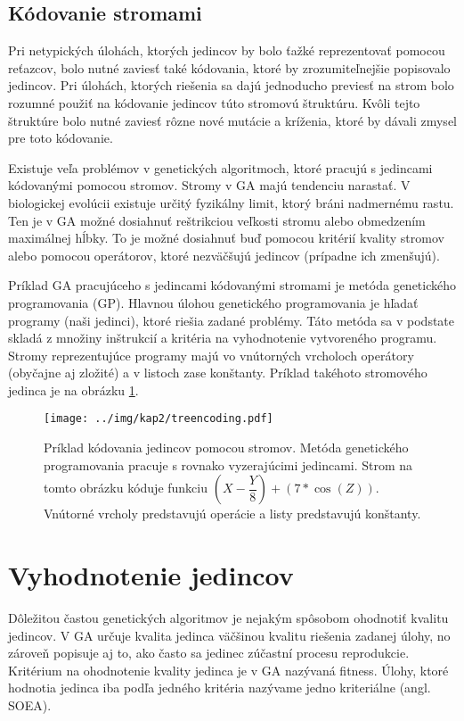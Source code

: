 \subsection{Kódovanie stromami}\label{kap2:2.2:2.2.3:Tree}
Pri netypických úlohách, ktorých jedincov by bolo ťažké reprezentovať pomocou reťazcov, bolo nutné zaviesť také kódovania, ktoré by zrozumiteľnejšie popisovalo jedincov. Pri úlohách, ktorých riešenia sa dajú jednoducho previesť na strom bolo rozumné použiť na kódovanie jedincov túto stromovú štruktúru. Kvôli tejto štruktúre bolo nutné zaviesť rôzne nové mutácie a kríženia, ktoré by dávali zmysel pre toto kódovanie. 

Existuje veľa problémov v genetických algoritmoch, ktoré pracujú s jedincami kódovanými pomocou stromov. Stromy v GA majú tendenciu narastať. V biologickej evolúcii existuje určitý fyzikálny limit, ktorý bráni nadmernému rastu. Ten je v GA možné dosiahnuť reštrikciou veľkosti stromu alebo obmedzením maximálnej hĺbky. To je možné dosiahnuť buď pomocou kritérií kvality stromov alebo pomocou operátorov, ktoré nezväčšujú jedincov (prípadne ich zmenšujú).

Príklad GA pracujúceho s jedincami kódovanými stromami je metóda genetického programovania (GP). Hlavnou úlohou genetického programovania je hľadať programy (naši jedinci), ktoré riešia zadané problémy. Táto metóda sa v podstate skladá z množiny inštrukcií a kritéria na vyhodnotenie vytvoreného programu. Stromy reprezentujúce programy majú vo vnútorných vrcholoch operátory (obyčajne aj zložité) a v listoch zase konštanty. Príklad takéhoto stromového jedinca je na obrázku \ref{fig:TreEncoding}.
\begin{figure}[h]
\centering
\centerline{\mbox{\texttt{[image: ../img/kap2/treencoding.pdf]}}}
\caption{Príklad kódovania jedincov pomocou stromov. Metóda genetického programovania pracuje s rovnako vyzerajúcimi jedincami. Strom na tomto obrázku kóduje funkciu $\left(X - \dfrac{Y}{8}\right) + \left(7 * \cos(Z)\right)$. Vnútorné vrcholy predstavujú operácie a listy predstavujú konštanty. }\label{fig:TreEncoding}
\end{figure}

\section{Vyhodnotenie jedincov}\label{kap2:2.3:Fitnesses}
Dôležitou častou genetických algoritmov je nejakým spôsobom ohodnotiť kvalitu jedincov. V GA určuje kvalita jedinca väčšinou kvalitu riešenia zadanej úlohy, no zároveň popisuje aj to, ako často sa jedinec zúčastní procesu reprodukcie. Kritérium na ohodnotenie kvality jedinca je v GA nazývaná fitness. Úlohy, ktoré hodnotia jedinca iba podľa jedného kritéria nazývame jedno kriteriálne (angl. SOEA). 


